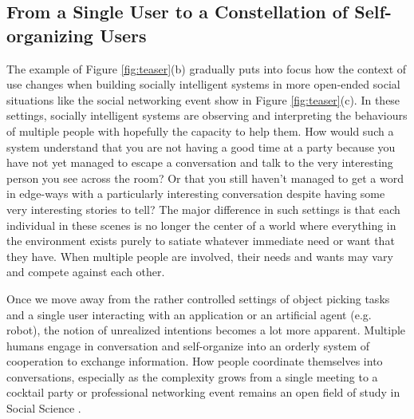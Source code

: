 \documentclass[manuscript,screen,review]{acmart}
\begin{document}
\subsection{From a Single User to a Constellation of Self-organizing Users}
The example of Figure \ref{fig:teaser}(b) gradually puts into focus how the context of use changes when building socially intelligent systems in more open-ended social situations like the social networking event show in Figure \ref{fig:teaser}(c). In these settings, socially intelligent systems are observing and interpreting the behaviours of multiple people with hopefully the capacity to help them. How would such a system understand that you are not having a good time at a party because you have not yet managed to escape a conversation and talk to the very interesting person you see across the room? Or that you still haven't managed to get a word in edge-ways with a particularly interesting conversation despite having some very interesting stories to tell? The major difference in such settings is that each individual in these scenes is no longer the center of a world where everything in the environment exists purely to satiate whatever immediate need or want that they have. When multiple people are involved, their needs and wants may vary and compete against each other.


Once we move away from the rather controlled settings of object picking tasks and a single user interacting with an application or an artificial agent (e.g. robot), the notion of unrealized intentions becomes a lot more apparent. Multiple humans engage in conversation and self-organize into an orderly system of cooperation to exchange information. How people coordinate themselves into conversations, especially as the complexity grows from a single meeting to a cocktail party or professional networking event remains an open field of study in Social Science \cite{KendonInteraction1990,dioszegietal2020b}. 
\end{document}
